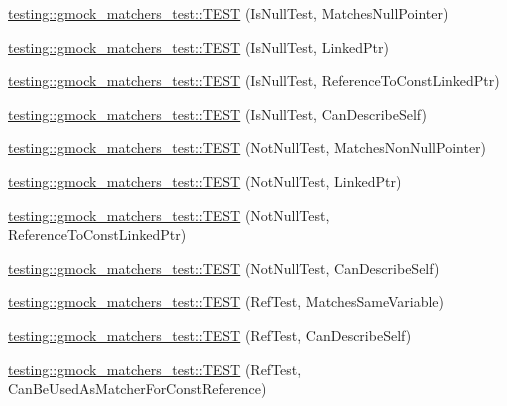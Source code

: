 \begin{DoxyCompactItemize}
\item 
\hyperlink{namespacetesting_1_1gmock__matchers__test_ae1c2971c161e051bf52b86b62c51bb95}{testing\+::gmock\+\_\+matchers\+\_\+test\+::\+T\+E\+ST} (Is\+Null\+Test, Matches\+Null\+Pointer)
\item 
\hyperlink{namespacetesting_1_1gmock__matchers__test_a0b1655e1640b7da6e1e7cc35074d9274}{testing\+::gmock\+\_\+matchers\+\_\+test\+::\+T\+E\+ST} (Is\+Null\+Test, Linked\+Ptr)
\item 
\hyperlink{namespacetesting_1_1gmock__matchers__test_afaaf0776096c0ad62de8236ab1b774d7}{testing\+::gmock\+\_\+matchers\+\_\+test\+::\+T\+E\+ST} (Is\+Null\+Test, Reference\+To\+Const\+Linked\+Ptr)
\item 
\hyperlink{namespacetesting_1_1gmock__matchers__test_a5ba91e0b79fcc0b17b1c1e373e741c38}{testing\+::gmock\+\_\+matchers\+\_\+test\+::\+T\+E\+ST} (Is\+Null\+Test, Can\+Describe\+Self)
\item 
\hyperlink{namespacetesting_1_1gmock__matchers__test_a694ea33511eab7822b88d8e74b388534}{testing\+::gmock\+\_\+matchers\+\_\+test\+::\+T\+E\+ST} (Not\+Null\+Test, Matches\+Non\+Null\+Pointer)
\item 
\hyperlink{namespacetesting_1_1gmock__matchers__test_aec956599ef91df968fec972247c7a28a}{testing\+::gmock\+\_\+matchers\+\_\+test\+::\+T\+E\+ST} (Not\+Null\+Test, Linked\+Ptr)
\item 
\hyperlink{namespacetesting_1_1gmock__matchers__test_a9e9560feb52f60475f653c15cc7466aa}{testing\+::gmock\+\_\+matchers\+\_\+test\+::\+T\+E\+ST} (Not\+Null\+Test, Reference\+To\+Const\+Linked\+Ptr)
\item 
\hyperlink{namespacetesting_1_1gmock__matchers__test_a68da7653e6a480c60a3a03fe8afb20fc}{testing\+::gmock\+\_\+matchers\+\_\+test\+::\+T\+E\+ST} (Not\+Null\+Test, Can\+Describe\+Self)
\item 
\hyperlink{namespacetesting_1_1gmock__matchers__test_a199983108927dadee9bd2e03ddd6057d}{testing\+::gmock\+\_\+matchers\+\_\+test\+::\+T\+E\+ST} (Ref\+Test, Matches\+Same\+Variable)
\item 
\hyperlink{namespacetesting_1_1gmock__matchers__test_ad8fc5a82cbb4b5b8147798be06d7059b}{testing\+::gmock\+\_\+matchers\+\_\+test\+::\+T\+E\+ST} (Ref\+Test, Can\+Describe\+Self)
\item 
\hyperlink{namespacetesting_1_1gmock__matchers__test_af1e64d057f2c46cc17f1c96a075cde6b}{testing\+::gmock\+\_\+matchers\+\_\+test\+::\+T\+E\+ST} (Ref\+Test, Can\+Be\+Used\+As\+Matcher\+For\+Const\+Reference)
\item 

\end{DoxyCompactItemize}
